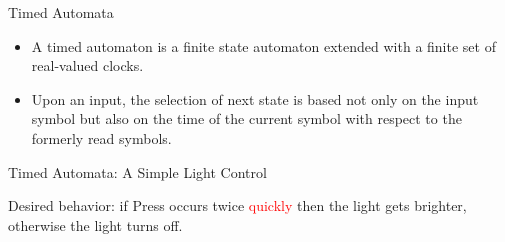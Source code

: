 \documentclass[10pt]{beamer}
\theoremstyle{plain}
\theoremstyle{definition}
\begin{document}
\begin{frame}{Timed Automata}
	\begin{itemize}
		\item A timed automaton is a finite state automaton extended with a finite set of real-valued clocks. 
		\item Upon an input, the selection of next state is based not only on the input symbol but also on the time of the current symbol with respect to the formerly read symbols. 
	\end{itemize}
%	
\end{frame}

\begin{frame}{%
Timed Automata:	A Simple Light Control}
\begin{figure}[!t]
	\begin{center}
		
	\end{center}
\end{figure}
Desired behavior: if Press occurs twice {\textcolor{red} {quickly}} then the light gets brighter, otherwise the light turns off.
\end{frame}
\end{document}

